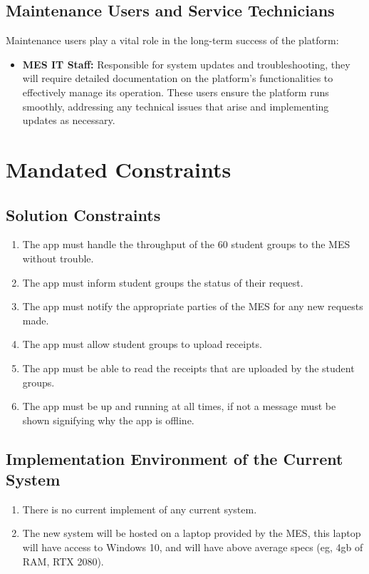 \documentclass[12pt]{article}
\begin{document}
\subsection{Maintenance Users and Service Technicians}
Maintenance users play a vital role in the long-term success of the platform:
\begin{itemize}
    \item \textbf{MES IT Staff:} Responsible for system updates and troubleshooting, they will require detailed documentation on the platform's functionalities to effectively manage its operation. These users ensure the platform runs smoothly, addressing any technical issues that arise and implementing updates as necessary.
\end{itemize}




\section{Mandated Constraints}
\subsection{Solution Constraints}
\begin{enumerate}
  \item The app must handle the throughput of the 60 student groups to the MES without trouble.
  \item The app must inform student groups the status of their request. 
  \item The app must notify the appropriate parties of the MES for any new requests made.
  \item The app must allow student groups to upload receipts. 
  \item The app must be able to read the receipts that are uploaded by the student groups. 
  \item The app must be up and running at all times, if not a message must be shown signifying why the app is offline. 
\end{enumerate}
\subsection{Implementation Environment of the Current System}
\begin{enumerate}
  \item There is no current implement of any current system.
  \item The new system will be hosted on a laptop provided by the MES, this laptop will have access to Windows 10, and will have above average specs (eg, 4gb of RAM, RTX 2080).
\end{enumerate}
\end{document}
